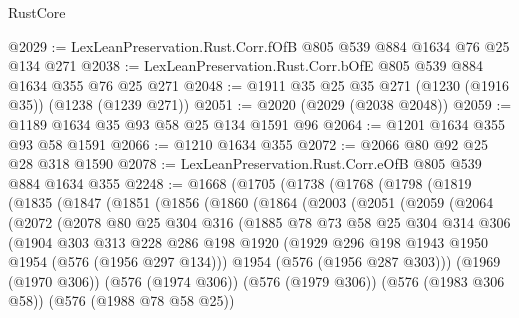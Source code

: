 \begin{lexlean}{RustCore}
\begin{coremodule}
@2029 := LexLeanPreservation.Rust.Corr.fOfB @805 @539 @884 @1634 @76 @25 @134 @271
@2038 := LexLeanPreservation.Rust.Corr.bOfE @805 @539 @884 @1634 @355 @76 @25 @271
@2048 := @1911 @35 @25 @35 @271 (@1230 (@1916 @35)) (@1238 (@1239 @271))
@2051 := @2020 (@2029 (@2038 @2048))
@2059 := @1189 @1634 @35 @93 @58 @25 @134 @1591 @96
@2064 := @1201 @1634 @355 @93 @58 @1591
@2066 := @1210 @1634 @355
@2072 := @2066 @80 @92 @25 @28 @318 @1590
@2078 := LexLeanPreservation.Rust.Corr.eOfB @805 @539 @884 @1634 @355
@2248 := @1668
    (@1705
      (@1738
        (@1768
          (@1798
            (@1819
              (@1835
                (@1847
                  (@1851
                    (@1856
                      (@1860
                        (@1864
                          (@2003
                            (@2051
                              (@2059
                                (@2064
                                  (@2072
                                    (@2078
                                      @80
                                      @25
                                      @304
                                      @316
                                      (@1885
                                        @78
                                        @73
                                        @58
                                        @25
                                        @304
                                        @314
                                        @306
                                        (@1904
                                          @303
                                          @313
                                          @228
                                          @286
                                          @198
                                          @1920
                                          (@1929
                                            @296
                                            @198
                                            @1943
                                            @1950
                                            @1954
                                            (@576 (@1956 @297 @134)))
                                          @1954
                                          (@576 (@1956 @287 @303)))
                                        (@1969 (@1970 @306))
                                        (@576 (@1974 @306))
                                        (@576 (@1979 @306))
                                        (@576 (@1983 @306 @58))
                                        (@576 (@1988 @78 @58 @25))

\end{coremodule}
\end{lexlean}
